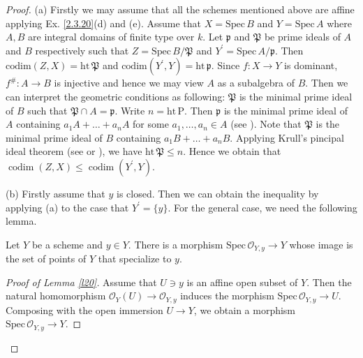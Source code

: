 \begin{proof}
	(a) Firstly we may assume that all the schemes mentioned above are affine applying Ex. \ref{2.3.20}(d) and (e). Assume that $X=\mathrm{Spec}\,B$ and $Y=\mathrm{Spec}\,A$ where $A,B$ are integral domains of finite type over $k$. Let $\mathfrak{p}$ and $\mathfrak{P}$ be prime ideals of $A$ and $B$ respectively such that $Z=\mathrm{Spec}\,B/\mathfrak{P}$ and $Y^{\prime}=\mathrm{Spec}\,A/\mathfrak{p}$. Then $\mathrm{codim}(Z,X)=\mathrm{ht}\,\mathfrak{P}$ and $\mathrm{codim}(Y^{\prime},Y)=\mathrm{ht}\,\mathfrak{p}$. Since $f:X\to Y$ is dominant, $f^{\#}:A\to B$ is injective and hence we may view $A$ as a subalgebra of $B$. Then we can interpret the geometric conditions as following: $\mathfrak{P}$ is the minimal prime ideal of $B$ such that $\mathfrak{P}\cap A=\mathfrak{p}$. Write $n=\mathrm{ht}\,\mathrm{P}$. Then $\mathfrak{p}$ is the minimal prime ideal of $A$ containing $a_1A+\dots+a_nA$ for some $a_1,\dots,a_n\in A$ (see \cite[Ch. 5, Th. 13.6, P. 100]{MAT}). Note that $\mathfrak{P}$ is the minimal prime ideal of $B$ containing $a_1B+\dots+a_nB$. Applying Krull's pincipal ideal theorem (see \cite[Ch. 11, Cor. 11.17, P. 122]{ATIY} or \cite[Ch. 5, Th. 13.5, P. 100]{MAT}), we have $\mathrm{ht}\,\mathfrak{P}\leq n$. Hence we obtain that $\operatorname{codim}(Z, X) \leq \operatorname{codim}(Y^{\prime}, Y)$.
	
	(b) Firstly assume that $y$ is closed. Then we can obtain the inequality by applying (a) to the case that $Y^{\prime}=\{y\}$. For the general case, we need the following lemma.
	\begin{lm}
		\label{l20}
		Let $Y$ be a scheme and $y\in Y$. There is a morphism $\mathrm{Spec}\,\mathcal{O}_{Y,y}\to Y$ whose image is the set of points of $Y$ that specialize to $y$.
	\end{lm}
	\begin{proof}[Proof of Lemma \ref*{l20}]
		Assume that $U\ni y$ is an affine open subset of $Y$. Then the natural homomorphism $\mathcal{O}_{Y}(U)\to\mathcal{O}_{Y,y}$ induces the morphism $\mathrm{Spec}\,\mathcal{O}_{Y,y}\to U$. Composing with the open immersion $U\to Y$, we obtain a morphism $\mathrm{Spec}\,\mathcal{O}_{Y,y}\to Y$.
		

\end{proof}
\end{proof}
